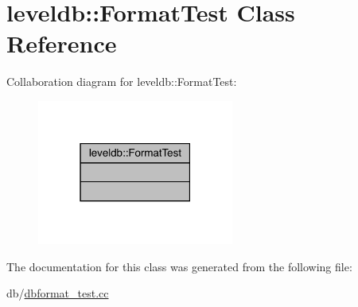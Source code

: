\hypertarget{classleveldb_1_1_format_test}{}\section{leveldb\+::Format\+Test Class Reference}
\label{classleveldb_1_1_format_test}


Collaboration diagram for leveldb\+::Format\+Test\+:
\nopagebreak
\begin{figure}[H]
\begin{center}
\leavevmode
\includegraphics[width=183pt]{classleveldb_1_1_format_test__coll__graph}
\end{center}
\end{figure}


The documentation for this class was generated from the following file\+:\begin{DoxyCompactItemize}
\item 
db/\mbox{\hyperlink{dbformat__test_8cc}{dbformat\+\_\+test.\+cc}}\end{DoxyCompactItemize}
